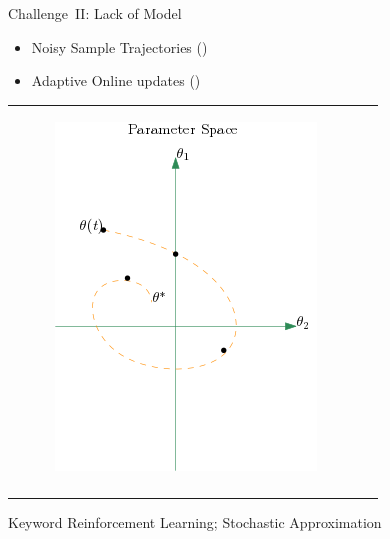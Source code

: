 \documentclass[10pt,handout]{beamer}
\begin{document}
\begin{frame}[fragile]{Challenge~II: {Lack of Model}}
\begin{itemize}
\item Noisy Sample Trajectories ({\color{orange}{$s_0-a_0-s_1-a_1-\cdots$}})
\item Adaptive Online updates ({\color{orange}{$\theta(0), \theta(1), \ldots, \theta(t)$}})
\end{itemize}
\begin{table}
\begin{tabular}{cc}
\begin{minipage}{0.5\textwidth}
\begin{figure}
\includegraphics[scale=0.4]{traj.png}
\end{figure}
\end{minipage}
&
\begin{minipage}{0.5\textwidth}
\begin{block}{Question}
{\color{orange}{Stability?}}\\
{\color{orange}{$\theta(t)\ra \theta^*$ ?}}
\end{block}
\end{minipage}
\end{tabular}
\end{table}
\begin{block}{Keyword}
Reinforcement Learning; Stochastic Approximation
\end{block}

\end{frame}
\end{document}
